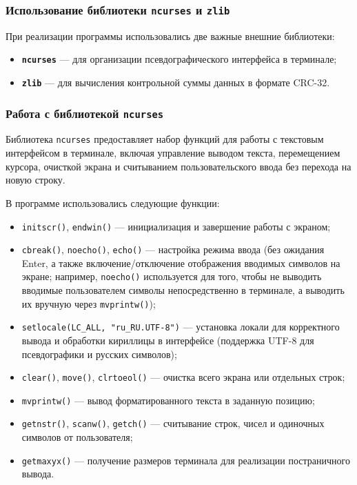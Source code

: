 \subsubsection*{Использование библиотеки \texttt{ncurses} и \texttt{zlib}}

При реализации программы использовались две важные внешние библиотеки:

\begin{itemize}
    \item \textbf{\texttt{ncurses}} — для организации псевдографического интерфейса в терминале;
    \item \textbf{\texttt{zlib}} — для вычисления контрольной суммы данных в формате CRC-32.
\end{itemize}

\subsubsection*{Работа с библиотекой \texttt{ncurses}}

Библиотека \texttt{ncurses} предоставляет набор функций для работы с текстовым интерфейсом в терминале, включая управление выводом текста, перемещением курсора, очисткой экрана и считыванием пользовательского ввода без перехода на новую строку.

В программе использовались следующие функции:
\begin{itemize}
    \item \texttt{initscr()}, \texttt{endwin()} — инициализация и завершение работы с экраном;
    \item \texttt{cbreak()}, \texttt{noecho()}, \texttt{echo()} — настройка режима ввода (без ожидания Enter, а также включение/отключение отображения вводимых символов на экране; например, \texttt{noecho()} используется для того, чтобы не выводить вводимые пользователем символы непосредственно в терминале, а выводить их вручную через \texttt{mvprintw()});
    \item \texttt{setlocale(LC\_ALL, "ru\_RU.UTF-8")} — установка локали для корректного вывода и обработки кириллицы в интерфейсе (поддержка UTF-8 для псевдографики и русских символов);
    \item \texttt{clear()}, \texttt{move()}, \texttt{clrtoeol()} — очистка всего экрана или отдельных строк;
    \item \texttt{mvprintw()} — вывод форматированного текста в заданную позицию;
    \item \texttt{getnstr()}, \texttt{scanw()}, \texttt{getch()} — считывание строк, чисел и одиночных символов от пользователя;
    \item \texttt{getmaxyx()} — получение размеров терминала для реализации постраничного вывода.
\end{itemize}

